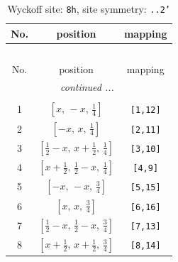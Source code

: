 \documentclass[fleqn,8pt]{jsarticle}
\begin{document}
\begin{longtable}{ccc}
\caption{Wyckoff site: {\tt 8h}, site symmetry: {\tt ..2'}}
 \\
 \hline \hline
No. & position & mapping \\ \hline \endfirsthead

\multicolumn{2}{l}{\tablename\ \thetable{}} \\
 \hline \hline
No. & position & mapping \\ \hline \endhead

 \hline \hline
\multicolumn{2}{r}{\footnotesize\it continued ...} \\ \endfoot

 \hline \hline
\multicolumn{2}{r}{} \\ \endlastfoot

1 & $\left[ x,\, - x,\, \frac{1}{4} \right]$ & {\tt [1,12]} \\ \hline
2 & $\left[ - x,\, x,\, \frac{1}{4} \right]$ & {\tt [2,11]} \\ \hline
3 & $\left[ \frac{1}{2} - x,\, x + \frac{1}{2},\, \frac{1}{4} \right]$ & {\tt [3,10]} \\ \hline
4 & $\left[ x + \frac{1}{2},\, \frac{1}{2} - x,\, \frac{1}{4} \right]$ & {\tt [4,9]} \\ \hline
5 & $\left[ - x,\, - x,\, \frac{3}{4} \right]$ & {\tt [5,15]} \\ \hline
6 & $\left[ x,\, x,\, \frac{3}{4} \right]$ & {\tt [6,16]} \\ \hline
7 & $\left[ \frac{1}{2} - x,\, \frac{1}{2} - x,\, \frac{3}{4} \right]$ & {\tt [7,13]} \\ \hline
8 & $\left[ x + \frac{1}{2},\, x + \frac{1}{2},\, \frac{3}{4} \right]$ & {\tt [8,14]} \\
\end{longtable}
\renewcommand{\arraystretch}{1.2}
\end{document}
